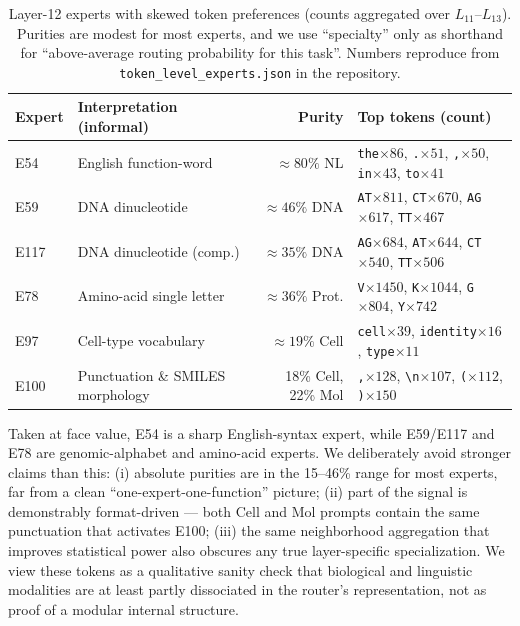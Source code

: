 \documentclass[11pt]{article}
\begin{document}
\begin{table}[H]
\centering
\footnotesize
\caption{Layer-12 experts with skewed token preferences (counts aggregated over $L_{11}$--$L_{13}$). Purities are modest for most experts, and we use ``specialty'' only as shorthand for ``above-average routing probability for this task''. Numbers reproduce from \texttt{token\_level\_experts.json} in the repository.}
\label{tab:atomic}
\begin{tabular}{llrl}
\toprule
\textbf{Expert} & \textbf{Interpretation (informal)} & \textbf{Purity} & \textbf{Top tokens (count)} \\
\midrule
E54  & English function-word     & $\approx 80\%$ NL    & \texttt{the}$\times 86$, \texttt{.}$\times 51$, \texttt{,}$\times 50$, \texttt{in}$\times 43$, \texttt{to}$\times 41$ \\
E59  & DNA dinucleotide          & $\approx 46\%$ DNA   & \texttt{AT}$\times 811$, \texttt{CT}$\times 670$, \texttt{AG}$\times 617$, \texttt{TT}$\times 467$ \\
E117 & DNA dinucleotide (comp.)  & $\approx 35\%$ DNA   & \texttt{AG}$\times 684$, \texttt{AT}$\times 644$, \texttt{CT}$\times 540$, \texttt{TT}$\times 506$ \\
E78  & Amino-acid single letter  & $\approx 36\%$ Prot. & \texttt{V}$\times 1450$, \texttt{K}$\times 1044$, \texttt{G}$\times 804$, \texttt{Y}$\times 742$ \\
E97  & Cell-type vocabulary      & $\approx 19\%$ Cell  & \texttt{cell}$\times 39$, \texttt{identity}$\times 16$, \texttt{type}$\times 11$ \\
E100 & Punctuation \& SMILES morphology & 18\% Cell, 22\% Mol & \texttt{,}$\times 128$, \texttt{\textbackslash n}$\times 107$, \texttt{(}$\times 112$, \texttt{)}$\times 150$ \\
\bottomrule
\end{tabular}
\end{table}

Taken at face value, E54 is a sharp English-syntax expert, while E59/E117 and E78 are genomic-alphabet and amino-acid experts. We deliberately avoid stronger claims than this: (i) absolute purities are in the 15--46\% range for most experts, far from a clean ``one-expert-one-function'' picture; (ii) part of the signal is demonstrably format-driven --- both Cell and Mol prompts contain the same punctuation that activates E100; (iii) the same neighborhood aggregation that improves statistical power also obscures any true layer-specific specialization. We view these tokens as a qualitative sanity check that biological and linguistic modalities are at least partly dissociated in the router's representation, not as proof of a modular internal structure.
\end{document}
